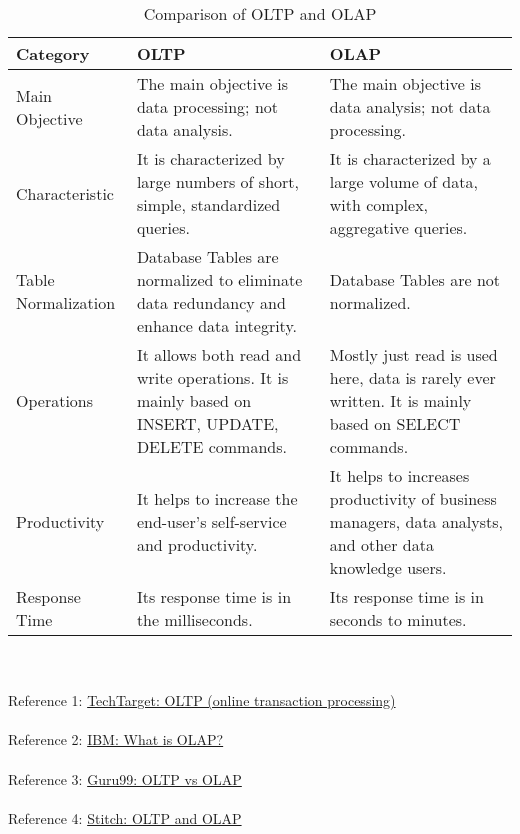 \documentclass{article}
\begin{document}
\begin{table}[hbt]
    \centering
    \begin{tabular}{|p{3cm}||p{6cm}|p{6cm}|}
        \hline
        Category & OLTP & OLAP 
        \\ \hline \hline
        Main Objective &
        The main objective is data processing; not data analysis. &
        The main objective is data analysis; not data processing.
        \\ \hline
        Characteristic &
        It is characterized by large numbers of short, simple, standardized queries. &
        It is characterized by a large volume of data, with complex, aggregative queries.
        \\ \hline
        Table Normalization &
        Database Tables are normalized to eliminate data redundancy and enhance data integrity. &
        Database Tables are not normalized.
        \\ \hline
        Operations &
        It allows both read and write operations. It is mainly based on INSERT, UPDATE, DELETE commands. &
        Mostly just read is used here, data is rarely ever written. It is mainly based on SELECT commands.
        \\ \hline
        Productivity &
        It helps to increase the end-user’s self-service and productivity. &
        It helps to increases productivity of business managers, data analysts, and other data knowledge users.
        \\ \hline
        Response Time &
        Its response time is in the milliseconds. &
        Its response time is in seconds to minutes.
        \\ \hline
    \end{tabular}
    \caption{Comparison of OLTP and OLAP}
    \label{tab:my_label}
\end{table}
\\
\\
Reference 1:
{\color{blue}
\href{https://www.techtarget.com/searchdatacenter/definition/OLTP}
{TechTarget: OLTP (online transaction processing)}
}
\\ \\ 
Reference 2:
{\color{blue}
\href{https://rb.gy/rqxst6}
{IBM: What is OLAP?}
}
\\ \\
Reference 3:
{\color{blue}
\href{https://www.guru99.com/oltp-vs-olap.html}
{Guru99: OLTP vs OLAP}
}
\\ \\
Reference 4:
{\color{blue}
\href{https://www.stitchdata.com/resources/oltp-vs-olap}
{Stitch: OLTP and OLAP}
}
\end{document}
